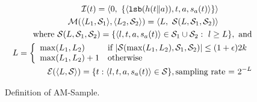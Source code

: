 \documentclass[10pt,twocolumn]{article}
\newcommand{\amfm}{AM-FM\xspace}
\newcommand{\amsampl}{AM-Sample\xspace}
\newcommand{\eat}[1]{}
\newcommand{\lsb}{\mbox{\tt lsb}}
\newcommand\calS{\ensuremath{\mathcal S}}
\begin{document}
\eat{
The gist of the technique is to collect \emph{all} distinct values that
would turn on each FM bit position in \amfm (Section~\ref{sec:count}),
instead of exemplars for each bit position.  After an aggregator 
fuses all of its input PSRs, if the resulting PSR contains more than
$2k$ values, then the aggregator must drop some values from the current
sample.  Starting with the rightmost 1-bit in the sketch, the aggregator
``prunes'' that bit, dropping all values in the current sample that
would turn that bit on.  The process is repeated with higher-order FM
bits, until the current sample size has dropped below $2k$.
Figure~\ref{fig:distinctSample} describes this process precisely.
}



\begin{figure}
{\footnotesize
\begin{eqnarray}
\mathcal{I}(t) = \langle 0,\ \{ \langle \lsb(h(t\|a)), t, a, s_a(t)\rangle \}\rangle \hspace*{4em}
     \label{eqn:leafamsampl}\\
\mathcal{M}(\langle L_1, \calS_1\rangle , \langle L_2, \calS_2\rangle ) =
\langle L,\ \calS(L, \calS_1, \calS_2)\rangle  \hspace*{4em}\label{eqn:aggamsampl}\\
\mathrm{where\ }
\calS(L, \calS_1, \calS_2) = \{\langle l, t, a, s_a(t)\rangle \in\calS_1\cup\calS_2:\ l \geq L\}, 
        \mbox{ and} 
                               \nonumber\\
L = \left\{ \begin{array}{ll}
            \max(L_1, L_2)  &
              \mbox{if $|\calS(\max(L_1, L_2), \calS_1, \calS_2)|\leq (1+\epsilon)2k$}\\ 
             \max(L_1, L_2) +1   & \mbox{otherwise}
           \end{array} \right. \nonumber\\
\mathcal{E}(\langle L, \calS\rangle ) =
\{ t: \langle l, t, a, s_a(t)\rangle \in\calS\}, \mbox{sampling rate = } 2^{-L} 
\label{eqn:distinctSample-E}
\end{eqnarray}
}
\vspace*{-1.5em}
\caption{Definition of \amsampl.}

\end{figure}
\end{document}
